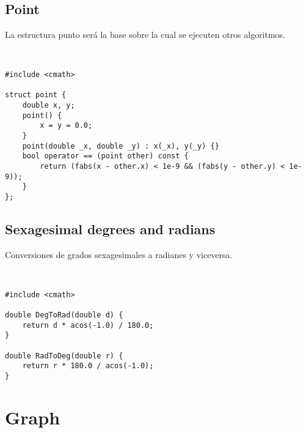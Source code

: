 \documentclass[11pt,letterpaper,twocolumn,twosided]{article}
\begin{document}
\subsection{Point}
La estructura punto ser\'a la base sobre la cual se ejecuten otros algoritmos. 
\begin{lstlisting}


#include <cmath>

struct point { 
	double x, y;
  	point() { 
  		x = y = 0.0; 
  	}
  	point(double _x, double _y) : x(_x), y(_y) {}        
  	bool operator == (point other) const {
   		return (fabs(x - other.x) < 1e-9 && (fabs(y - other.y) < 1e-9)); 
   	}
};

\end{lstlisting}

\subsection{Sexagesimal degrees and radians}
Conversiones de grados sexagesimales a radianes y viceversa.
\begin{lstlisting}


#include <cmath>

double DegToRad(double d) { 
	return d * acos(-1.0) / 180.0; 
}

double RadToDeg(double r) { 
	return r * 180.0 / acos(-1.0); 
}
\end{lstlisting}

\section{Graph}
\end{document}
